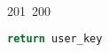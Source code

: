 201~200~\documentclass{article}
\begin{document}
\begin{lstlisting}[language=Python, caption=Hashing and Verifying Passwords with Argon2]
	                                                                                                                                                                                                                                                                                                	                                                                                                                                        	    	                                                                                                	                                                                                                                                                                                                                                                                                                                                	                                                                        	                                                                        	                                                                                                                                        	                                                                return user_key
	                                                                                                                                                                                                                                                                                                	                                                                                                                                        	    	                                                                                                	                                                                                                                                                                                                                                                                                                                                	                                                                        	                                                                        	                                                                                                                                        	                                                                \end{lstlisting}
\end{document}
